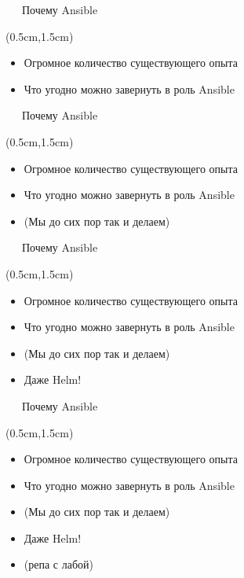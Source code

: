 \documentclass[xetex,18pt,aspectratio=43]{beamer}
\begin{document}
\begin{Large}
\begin{frame}{\ \ \ Почему Ansible}
\begin{textblock*}{\framewidth-0.8cm}(0.5cm,1.5cm)
\begin{itemize}
  \item Огромное количество существующего опыта
  \item Что угодно можно завернуть в роль Ansible
\end{itemize}
\end{textblock*}
\end{frame}

\begin{frame}{\ \ \ Почему Ansible}
\begin{textblock*}{\framewidth-0.8cm}(0.5cm,1.5cm)
\begin{itemize}
  \item Огромное количество существующего опыта
  \item Что угодно можно завернуть в роль Ansible
  \item (Мы до сих пор так и делаем)
\end{itemize}
\end{textblock*}
\end{frame}

\begin{frame}{\ \ \ Почему Ansible}
\begin{textblock*}{\framewidth-0.8cm}(0.5cm,1.5cm)
\begin{itemize}
  \item Огромное количество существующего опыта
  \item Что угодно можно завернуть в роль Ansible
  \item (Мы до сих пор так и делаем)
  \item Даже Helm!
\end{itemize}
\end{textblock*}
\end{frame}

\begin{frame}{\ \ \ Почему Ansible}
\begin{textblock*}{\framewidth-0.8cm}(0.5cm,1.5cm)
\begin{itemize}
  \item Огромное количество существующего опыта
  \item Что угодно можно завернуть в роль Ansible
  \item (Мы до сих пор так и делаем)
  \item Даже Helm!
  \item \href{https://clck.ru/JfL3n}{\color{blue}{https://clck.ru/JfL3n}} (репа с лабой)
\end{itemize}
\end{textblock*}
\end{frame}


\end{Large}
\end{document}
